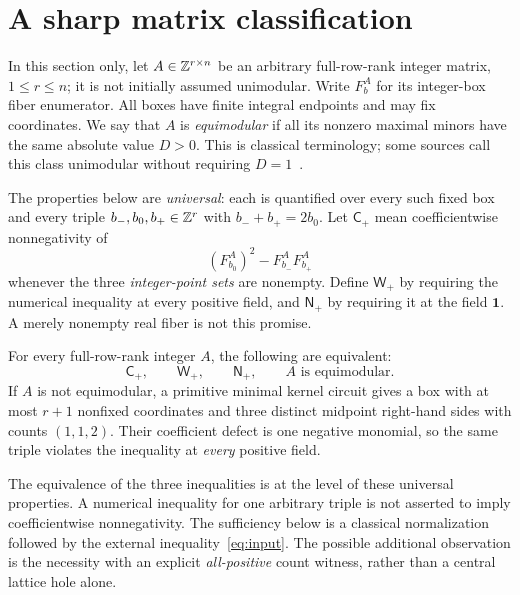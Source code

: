 \section{A sharp matrix classification}\label{sec:classification}
In this section only, let \(A\in\mathbb Z^{r\times n}\) be an arbitrary full-row-rank integer matrix, \(1\le r\le n\); it is not initially assumed unimodular. Write \(F^A_b\) for its integer-box fiber enumerator. All boxes have finite integral endpoints and may fix coordinates. We say that \(A\) is \emph{equimodular} if all its nonzero maximal minors have the same absolute value \(D>0\). This is classical terminology; some sources call this class unimodular without requiring \(D=1\)~\cite{BS,CGR}.

The properties below are \emph{universal}: each is quantified over every such fixed box and every triple \(b_-,b_0,b_+\in\mathbb Z^r\) with \(b_-+b_+=2b_0\). Let \(\mathsf C_+\) mean coefficientwise nonnegativity of
\[
 (F^A_{b_0})^2-F^A_{b_-}F^A_{b_+}
\]
whenever the three \emph{integer-point sets} are nonempty. Define \(\mathsf W_+\) by requiring the numerical inequality at every positive field, and \(\mathsf N_+\) by requiring it at the field \(\mathbf1\). A merely nonempty real fiber is not this promise.

\begin{theorem}\label{thm:classification}
For every full-row-rank integer \(A\), the following are equivalent:
\[
 \mathsf C_+,\qquad\mathsf W_+,\qquad\mathsf N_+,
 \qquad A\text{ is equimodular}.
\]
If \(A\) is not equimodular, a primitive minimal kernel circuit gives a box with at most \(r+1\) nonfixed coordinates and three distinct midpoint right-hand sides with counts \((1,1,2)\). Their coefficient defect is one negative monomial, so the same triple violates the inequality at \emph{every} positive field.
\end{theorem}

The equivalence of the three inequalities is at the level of these universal properties. A numerical inequality for one arbitrary triple is not asserted to imply coefficientwise nonnegativity. The sufficiency below is a classical normalization followed by the external inequality~\eqref{eq:input}. The possible additional observation is the necessity with an explicit \emph{all-positive} count witness, rather than a central lattice hole alone.

